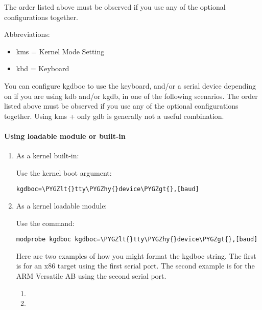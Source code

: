\documentclass[a4paper,8pt,english]{sphinxmanual}
\def\PYGZlt{\char`\<}
\def\PYGZgt{\char`\>}
\def\PYGZhy{\char`\-}
\begin{document}
The order listed above must be observed if you use any of the optional
configurations together.

Abbreviations:
\begin{itemize}
\item {} 
kms = Kernel Mode Setting

\item {} 
kbd = Keyboard

\end{itemize}

You can configure kgdboc to use the keyboard, and/or a serial device
depending on if you are using kdb and/or kgdb, in one of the following
scenarios. The order listed above must be observed if you use any of the
optional configurations together. Using kms + only gdb is generally not
a useful combination.


\paragraph{Using loadable module or built-in}
\label{dev-tools/kgdb:using-loadable-module-or-built-in}\begin{enumerate}
\item {} 
As a kernel built-in:

Use the kernel boot argument:

\begin{Verbatim}[commandchars=\\\{\}]
kgdboc=\PYGZlt{}tty\PYGZhy{}device\PYGZgt{},[baud]
\end{Verbatim}

\item {} 
As a kernel loadable module:

Use the command:

\begin{Verbatim}[commandchars=\\\{\}]
modprobe kgdboc kgdboc=\PYGZlt{}tty\PYGZhy{}device\PYGZgt{},[baud]
\end{Verbatim}

Here are two examples of how you might format the kgdboc string. The
first is for an x86 target using the first serial port. The second
example is for the ARM Versatile AB using the second serial port.
\begin{enumerate}
\item {} 

\item {} 

\end{enumerate}

\end{enumerate}
\end{document}
